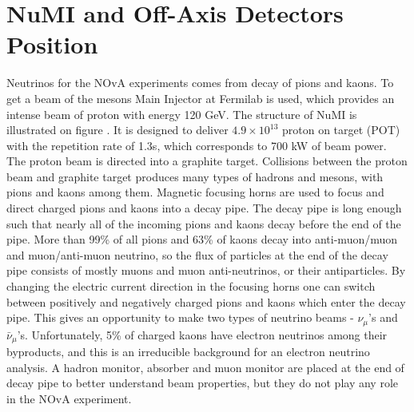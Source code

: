\section{NuMI and Off-Axis Detectors Position}
Neutrinos for the NOvA experiments comes from decay of pions and kaons. To get a beam of 
the mesons Main Injector at Fermilab is used, which provides an intense beam of proton with 
energy 120 GeV. The structure of NuMI is illustrated on figure . It is designed to 
deliver $4.9 \times 10^{13}$ proton on target (POT) with the repetition rate of 1.3s, which 
corresponds to 700 kW of beam power. The proton beam is directed into a graphite target.  
Collisions between the proton beam and graphite target produces many types of hadrons and 
mesons, with pions and kaons among them. Magnetic focusing horns are used to focus and direct 
charged pions and kaons into a decay pipe. The decay pipe is long enough such that nearly all 
of the incoming pions and kaons decay before the end of the pipe. More than 99\% of all pions 
and 63\% of kaons decay into anti-muon/muon and muon/anti-muon neutrino, so the flux of 
particles at the end of the decay pipe consists of mostly muons and muon anti-neutrinos, or 
their antiparticles. By changing the electric current direction in the focusing horns one can 
switch between positively and negatively charged pions and kaons which enter the decay pipe. 
This gives an opportunity to make two types of neutrino beams - $\nu_\mu$'s and $\bar{\nu}_\mu$'s. 
Unfortunately, 5\% of charged kaons have electron neutrinos among their byproducts, and this 
is an irreducible background for an electron neutrino analysis. A hadron monitor, absorber 
and muon monitor are placed at the end of decay pipe to better understand beam properties, 
but they do not play any role in the NOvA experiment.


